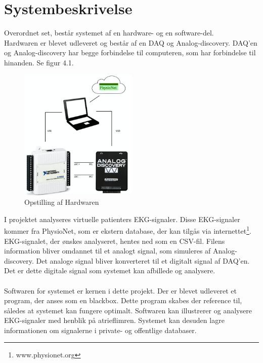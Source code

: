 \chapter{Systembeskrivelse}

Overordnet set, består systemet af en hardware- og en software-del.\\ Hardwaren er blevet udleveret og består af en DAQ og Analog-discovery. DAQ'en og Analog-discovery har begge forbindelse til computeren, som har forbindelse til hinanden. Se figur 4.1.  

\begin{figure}[H]
	\centering
	\includegraphics[width=0.5\textwidth]{Figurer/Snip20150427_1}
	\caption{Opstilling af Hardwaren}
\end{figure}

I projektet analyseres virtuelle patienters EKG-signaler. Disse EKG-signaler kommer fra PhysioNet, som er ekstern database, der kan tilgås via internettet\footnote{www.physionet.org}. EKG-signalet, der ønskes analyseret, hentes ned som en CSV-fil. Filens information bliver omdannet til et analogt signal, som simuleres af Analog-discovery. Det analoge signal bliver konverteret til et digitalt signal af DAQ'en. Det er dette digitale signal som systemet kan afbillede og analysere.
\\ \\
Softwaren for systemet er kernen i dette projekt. Der er blevet udleveret et program, der anses som en blackbox. Dette program skabes der reference til, således at systemet kan fungere optimalt. Softwaren kan illustrerer og analysere EKG-signaler med henblik på atrieflimren. Systemet kan desuden lagre informationen om signalerne i private- og offentlige databaser.           

